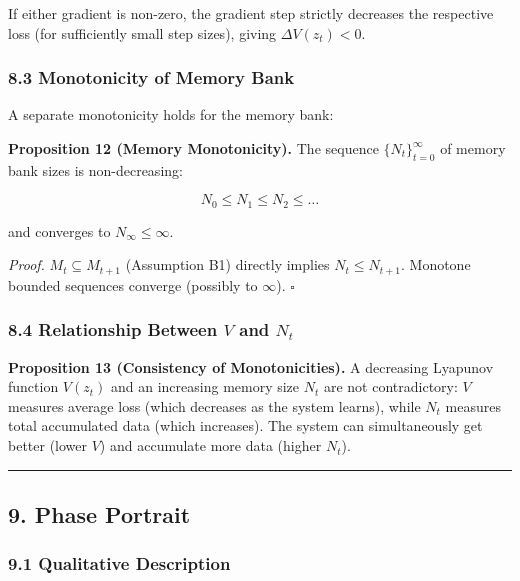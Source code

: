 \documentclass[
  12pt,
]{article}
\begin{document}
If either gradient is non-zero, the gradient step strictly decreases the
respective loss (for sufficiently small step sizes), giving
\(\Delta V(z_t) < 0\).

\subsubsection{8.3 Monotonicity of Memory
Bank}\label{monotonicity-of-memory-bank}

A separate monotonicity holds for the memory bank:

\textbf{Proposition 12 (Memory Monotonicity).} The sequence
\(\{N_t\}_{t=0}^\infty\) of memory bank sizes is non-decreasing:

\[N_0 \leq N_1 \leq N_2 \leq \dots\]

and converges to \(N_\infty \leq \infty\).

\emph{Proof.} \(M_t \subseteq M_{t+1}\) (Assumption B1) directly implies
\(N_t \leq N_{t+1}\). Monotone bounded sequences converge (possibly to
\(\infty\)). \(\square\)

\subsubsection{\texorpdfstring{8.4 Relationship Between \(V\) and
\(N_t\)}{8.4 Relationship Between V and N\_t}}\label{relationship-between-v-and-n_t}

\textbf{Proposition 13 (Consistency of Monotonicities).} A decreasing
Lyapunov function \(V(z_t)\) and an increasing memory size \(N_t\) are
not contradictory: \(V\) measures average loss (which decreases as the
system learns), while \(N_t\) measures total accumulated data (which
increases). The system can simultaneously get better (lower \(V\)) and
accumulate more data (higher \(N_t\)).

\begin{center}\rule{0.5\linewidth}{0.5pt}\end{center}

\subsection{9. Phase Portrait}\label{phase-portrait}

\subsubsection{9.1 Qualitative
Description}\label{qualitative-description}
\end{document}
